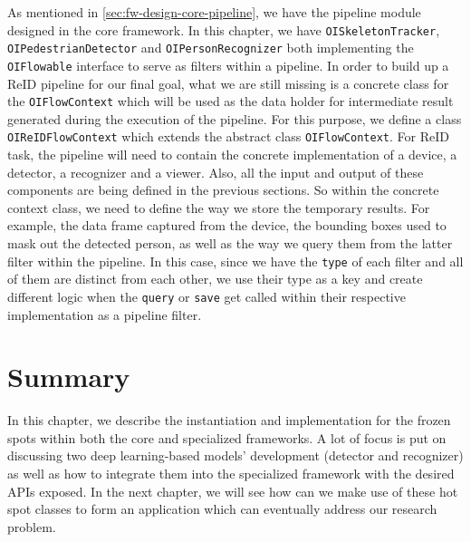 As mentioned in \autoref{sec:fw-design-core-pipeline}, we have the pipeline
module designed in the core framework. In this chapter, we have
\texttt{OISkeletonTracker}, \texttt{OIPedestrianDetector} and
\texttt{OIPersonRecognizer} both implementing the \texttt{OIFlowable} interface to
serve as filters within a pipeline. In order to build up a ReID pipeline for
our final goal, what we are still missing is a concrete class for the
\texttt{OIFlowContext} which will be used as the data holder for intermediate
result generated during the execution of the pipeline.
For this purpose, we define a class \texttt{OIReIDFlowContext} which extends
the abstract class \texttt{OIFlowContext}.
For ReID task, the pipeline will need to contain
the concrete implementation of a device, a detector, a recognizer and a viewer.
Also, all the input and output of these components are
being defined in the previous sections. So within the concrete context class,
we need to define the way we store the temporary results. For example, the
data frame captured from the device, the bounding boxes used to mask out the
detected person, as well as the way we query them from the latter filter within
the pipeline.
In this case, since we have the \texttt{type} of each filter and all of them
are distinct from each other, we use their type as a key and create
different logic when the \texttt{query} or \texttt{save} get called within
their respective implementation as a pipeline filter.

\section{Summary}
\label{sec:fw-inst-summary}

In this chapter, we describe the instantiation and implementation for the
frozen spots within both the core and specialized frameworks. A lot of focus is
put on discussing two deep learning-based models' development (detector and
recognizer) as well as how to integrate them into the specialized framework
with the desired APIs exposed.
In the next chapter, we will see how can we make use of these hot spot classes to form an
application which can eventually address our research problem.
